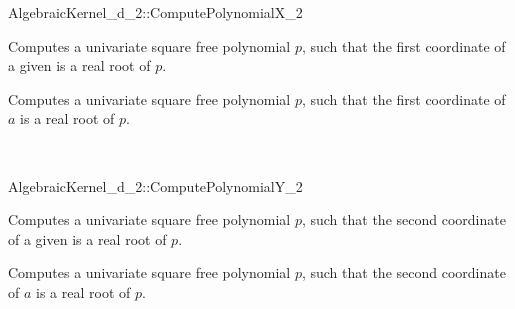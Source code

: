 \begin{ccRefFunctionObjectConcept}{AlgebraicKernel_d_2::ComputePolynomialX_2}

\ccDefinition
Computes a univariate square free polynomial $p$, such that the first coordinate of 
a given  is a real root of $p$.
 
\ccRefines 
{}  

\ccTypes \ccThree{}{+++++++++++++}{++++++++}
\ccGlue
{}

\ccOperations \ccThree{+++++++++}{+++++++++}{}

{Computes a univariate square free polynomial $p$, such that the first 
coordinate of $a$ is a real root of $p$.}


\ccSeeAlso
{}\\

\end{ccRefFunctionObjectConcept}


\begin{ccRefFunctionObjectConcept}{AlgebraicKernel_d_2::ComputePolynomialY_2}

\ccDefinition
Computes a univariate square free polynomial $p$, such that the second coordinate of 
a given  is a real root of $p$.
 
\ccRefines 
{}  

\ccTypes \ccThree{}{+++++++++++++}{++++++++}
\ccGlue
{}

\ccOperations \ccThree{+++++++++}{+++++++++}{}

{Computes a univariate square free polynomial $p$, such that the second coordinate of $a$ 
is a real root of $p$.}

\ccSeeAlso
{}\\

\end{ccRefFunctionObjectConcept}